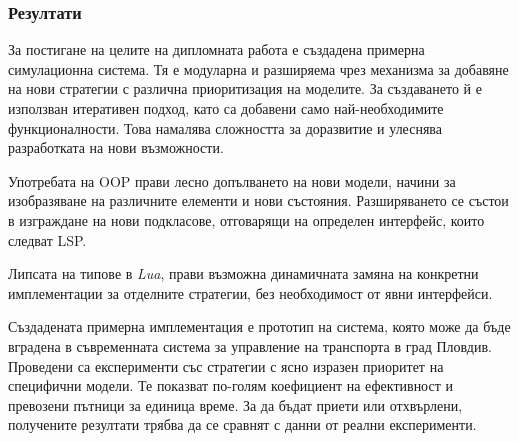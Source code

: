 \subsubsection{Резултати}

		За постигане на целите на дипломната работа е създадена примерна симулационна система. Тя е модуларна и разширяема
		чрез механизма за добавяне на нови стратегии с различна приоритизация на моделите. За създаването й е използван
		итеративен подход, като са добавени само най-необходимите функционалности. Това намалява сложността за доразвитие
		и улеснява разработката на нови възможности. 
		
		Употребата на \ac{OOP} прави лесно допълването на нови модели, начини за изобразяване на различните елементи и нови състояния.
		Разширяването се състои в изграждане на нови подкласове, отговарящи на определен интерфейс, които следват \ac{LSP}.
		
		Липсата на типове в \emph{Lua}, прави възможна динамичната замяна на конкретни имплементации за отделните стратегии, без
		необходимост от явни интерфейси.
		
		Създадената примерна имплементация е прототип на система, която може да бъде вградена
		в съвременната система за управление на транспорта в град Пловдив. Проведени са експерименти със стратегии 
		с ясно изразен приоритет на специфични модели. Те показват по-голям коефициент на ефективност и превозени пътници за единица време.
		За да бъдат приети или отхвърлени, получените резултати трябва да се сравнят с данни от реални експерименти.